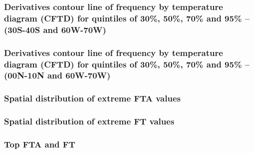 \documentclass[smaller]{beamer}
\begin{document}
\begin{frame}
\frametitle{Derivatives contour line of frequency by temperature diagram (CFTD)  for quintiles of 30\%, 50\%, 70\% and 95\% -- (30S-40S and 60W-70W)}

\end{frame}

\begin{frame}
\frametitle{Derivatives contour line of frequency by temperature diagram (CFTD)  for quintiles of 30\%, 50\%, 70\% and 95\% -- (00N-10N and 60W-70W)}

\end{frame}

\begin{frame}
\frametitle{Spatial distribution of extreme FTA values}

\end{frame}

\begin{frame}
\frametitle{Spatial distribution of extreme FT values}

\end{frame}



\begin{frame}
\frametitle{Top FTA and FT}

\end{frame}
\end{document}
